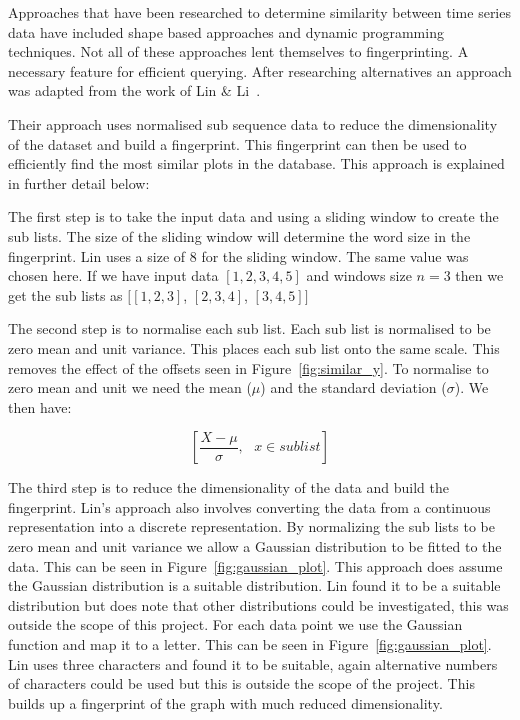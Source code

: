 Approaches that have been researched to determine similarity between time series data have included shape based approaches and dynamic programming techniques.  Not all of these approaches lent themselves to fingerprinting.  A necessary feature for efficient querying.  After researching alternatives an approach was adapted from the work of Lin \& Li~\cite{structural_similarity}.

Their approach uses normalised sub sequence data to reduce the dimensionality of the dataset and build a fingerprint.  This fingerprint can then be used to efficiently find the most similar plots in the database.  This approach is explained in further detail below:

The first step is to take the input data and using a sliding window to create the sub lists.  The size of the sliding window will determine the word size in the fingerprint.  Lin uses a size of 8 for the sliding window.  The same value was chosen here.  If we have input data $[1,2,3,4,5]$ and windows size $n = 3$ then we get the sub lists as $[[1,2,3]$, $[2,3,4]$, $[3,4,5]]$

The second step is to normalise each sub list.  Each sub list is normalised to be zero mean and unit variance.  This places each sub list onto the same scale.  This removes the effect of the offsets seen in Figure~\ref{fig:similar_y}.  To normalise to zero mean and unit we need the mean ($\mu$) and the standard deviation ($\sigma$).  We then have:

$$
\left[\frac{X - \mu}{\sigma},\text{   } x \in sublist\right]
$$

The third step is to reduce the dimensionality of the data and build the fingerprint.  Lin's approach also involves converting the data from a continuous representation into a discrete representation.  By normalizing the sub lists to be zero mean and unit variance we allow a Gaussian distribution to be fitted to the data.  This can be seen in Figure~\ref{fig:gaussian_plot}.  This approach does assume the Gaussian distribution is a suitable distribution.  Lin found it to be a suitable distribution but does note that other distributions could be investigated, this was outside the scope of this project.  For each data point we use the Gaussian function and map it to a letter.  This can be seen in Figure~\ref{fig:gaussian_plot}.  Lin uses three characters and found it to be suitable, again alternative numbers of characters could be used but this is outside the scope of the project.  This builds up a fingerprint of the graph with much reduced dimensionality.

